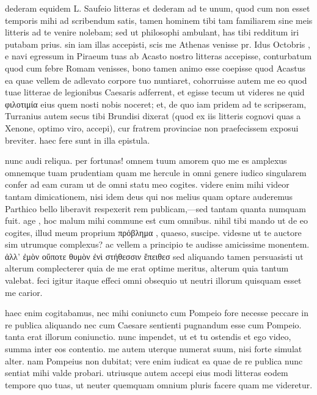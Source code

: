 


 dederam equidem L. Saufeio litteras et dederam ad te unum, quod cum non esset temporis mihi ad scribendum satis, tamen hominem tibi tam familiarem sine meis litteris ad te venire nolebam; sed ut philosophi ambulant, has tibi redditum iri putabam prius. sin iam illas accepisti, scis me Athenas venisse pr. Idus Octobris , e navi egressum in Piraeum tuas ab Acasto nostro litteras accepisse, conturbatum quod cum febre Romam venisses, bono tamen animo esse coepisse quod Acastus ea quae vellem de adlevato corpore tuo nuntiaret, cohorruisse autem me eo quod tuae litterae de legionibus Caesaris adferrent, et egisse tecum ut videres ne quid φιλοτιμία eius quem nosti nobis noceret; et, de quo iam pridem ad te scripseram, Turranius autem secus tibi Brundisi dixerat (quod ex iis litteris cognovi quas a Xenone, optimo viro, accepi), cur fratrem provinciae non praefecissem exposui breviter. haec fere sunt in illa epistula.

 nunc audi reliqua. per fortunas! omnem tuum amorem quo me es amplexus omnemque tuam prudentiam quam me hercule in omni genere iudico singularem confer ad eam curam ut de omni statu meo cogites. videre enim mihi videor tantam dimicationem, nisi idem deus qui nos melius quam optare auderemus Parthico bello liberavit respexerit rem publicam,—sed tantam quanta numquam fuit. age , hoc malum mihi commune est cum omnibus. nihil tibi mando ut de eo cogites, illud meum proprium πρόβλημα , quaeso, suscipe. videsne ut te auctore sim utrumque complexus? ac vellem a principio te audisse amicissime monentem. ἀλλ' ἐμὸν οὔποτε θυμὸν ἐνὶ στήθεσσιν ἔπειθεσ sed aliquando tamen persuasisti ut alterum complecterer quia de me erat optime meritus, alterum quia tantum valebat. feci igitur itaque effeci omni obsequio ut neutri illorum quisquam esset me carior.

 haec enim cogitabamus, nec mihi coniuncto cum Pompeio fore necesse peccare in re publica aliquando nec cum Caesare sentienti pugnandum esse cum Pompeio. tanta erat illorum coniunctio. nunc impendet, ut et tu ostendis et ego video, summa inter eos contentio. me autem uterque numerat suum, nisi forte simulat alter. nam Pompeius non dubitat; vere enim iudicat ea quae de re publica nunc sentiat mihi valde probari. utriusque autem accepi eius modi litteras eodem tempore quo tuas, ut neuter quemquam omnium pluris facere quam me videretur.

